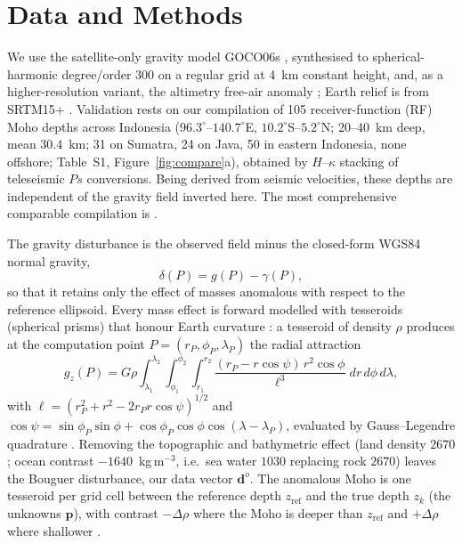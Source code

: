 \documentclass{agujournal2019}
\begin{document}
\section{Data and Methods}
We use the satellite-only gravity model GOCO06s \cite{kvas2021}, synthesised to
spherical-harmonic degree/order 300 on a regular grid at 4~km constant height, and,
as a higher-resolution variant, the altimetry free-air anomaly \cite{sandwell2014};
Earth relief is from SRTM15+ \cite{tozer2019}. Validation rests on our compilation of 105
receiver-function (RF) Moho depths across Indonesia \cite{fauzi2021}
($96.3^{\circ}$--$140.7^{\circ}$E, $10.2^{\circ}$S--$5.2^{\circ}$N; 20--40~km deep,
mean 30.4~km; 31 on Sumatra, 24 on Java, 50 in eastern Indonesia, none offshore;
Table~S1, Figure~\ref{fig:compare}a), obtained by $H$--$\kappa$ stacking of teleseismic
$Ps$ conversions. Being derived from seismic velocities, these depths are independent
of the gravity field inverted here. The most comprehensive comparable compilation is
.

The gravity disturbance is the observed field minus the closed-form WGS84 normal
gravity,
\begin{equation}
\delta(P) = g(P) - \gamma(P),
\label{eq:disturbance}
\end{equation}
so that it retains only the effect of masses anomalous with respect to the
reference ellipsoid. Every mass effect is forward modelled with tesseroids
(spherical prisms) that honour Earth curvature \cite{uieda2016}: a tesseroid of
density $\rho$ produces at the computation point $P=(r_P,\phi_P,\lambda_P)$ the
radial attraction
\begin{equation}
g_z(P) = G\rho \int_{\lambda_1}^{\lambda_2}\!\!\int_{\phi_1}^{\phi_2}\!\!
\int_{r_1}^{r_2}\frac{(r_P-r\cos\psi)\,r^{2}\cos\phi}{\ell^{3}}
\;dr\,d\phi\,d\lambda,
\label{eq:tesseroid}
\end{equation}
with $\ell=(r_P^{2}+r^{2}-2r_Pr\cos\psi)^{1/2}$ and
$\cos\psi=\sin\phi_P\sin\phi+\cos\phi_P\cos\phi\cos(\lambda-\lambda_P)$, evaluated
by Gauss--Legendre quadrature \cite{uieda2016}. Removing the topographic and
bathymetric effect (land density $2670$; ocean contrast $-1640$~kg\,m$^{-3}$, i.e.\ sea water $1030$ replacing rock $2670$)
leaves the Bouguer disturbance, our data vector $\mathbf{d}^{o}$. The anomalous Moho
is one tesseroid per grid cell between the reference depth $z_{\mathrm{ref}}$ and
the true depth $z_k$ (the unknowns $\mathbf{p}$), with contrast $-\Delta\rho$ where
the Moho is deeper than $z_{\mathrm{ref}}$ and $+\Delta\rho$ where shallower
\cite{uieda2017}.
\end{document}
